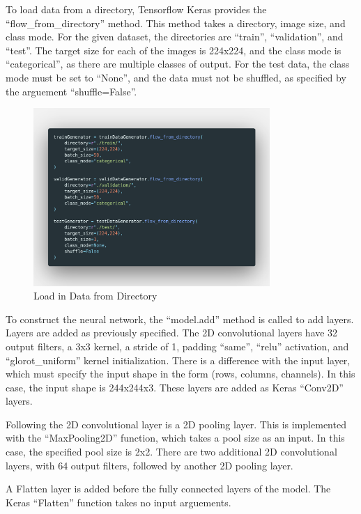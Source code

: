 To load data from a directory, Tensorflow Keras provides the
``flow\_from\_directory'' method. This method takes a directory, image size, and
class mode. For the given dataset, the directories are ``train'',
``validation'', and ``test''. The target size for each of the images is 224x224,
and the class mode is ``categorical'', as there are multiple classes of output.
For the test data, the class mode must be set to ``None'', and the data must not
be shuffled, as specified by the arguement ``shuffle=False''.

\begin{figure}[H]
	\centering
	\includegraphics[width=0.8\textwidth]{images/Code/loadDataFromDir}
	\caption{Load in Data from Directory}
	\label{fig:flow}
\end{figure}

To construct the neural network, the ``model.add'' method is called to add
layers. Layers are added as previously specified. The 2D convolutional layers
have 32 output filters, a 3x3 kernel, a stride of 1, padding ``same'', ``relu''
activation, and ``glorot\_uniform'' kernel initialization. There is a difference
with the input layer, which must specify the input shape in the form (rows,
columns, channels). In this case, the input shape is 244x244x3. These layers are
added as Keras ``Conv2D'' layers.

Following the 2D convolutional layer is a 2D pooling layer. This is implemented
with the ``MaxPooling2D'' function, which takes a pool size as an input. In this
case, the specified pool size is 2x2. There are two additional 2D convolutional
layers, with 64 output filters, followed by another 2D pooling layer.

A Flatten layer is added before the fully connected layers of the model. The
Keras ``Flatten'' function takes no input arguements.

